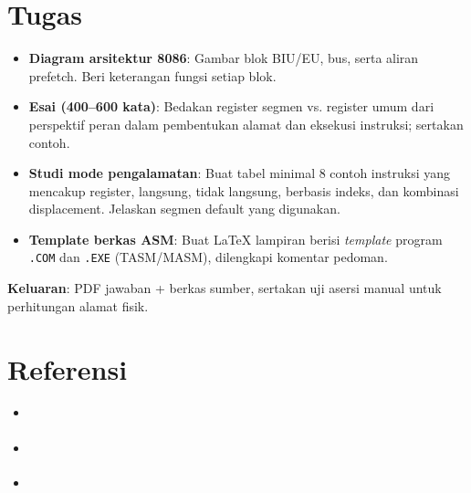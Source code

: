 \section{Tugas}
\begin{itemize}
  \item \textbf{Diagram arsitektur 8086}: Gambar blok BIU/EU, bus, serta aliran prefetch. Beri keterangan fungsi setiap blok.
  \item \textbf{Esai (400--600 kata)}: Bedakan register segmen vs. register umum dari perspektif peran dalam pembentukan alamat dan eksekusi instruksi; sertakan contoh.
  \item \textbf{Studi mode pengalamatan}: Buat tabel minimal 8 contoh instruksi yang mencakup register, langsung, tidak langsung, berbasis indeks, dan kombinasi displacement. Jelaskan segmen default yang digunakan.
  \item \textbf{Template berkas ASM}: Buat \LaTeX{} lampiran berisi \textit{template} program \texttt{.COM} dan \texttt{.EXE} (TASM/MASM), dilengkapi komentar pedoman.
\end{itemize}
\noindent\textbf{Keluaran}: PDF jawaban + berkas sumber, sertakan uji asersi manual untuk perhitungan alamat fisik.

\section{Referensi}\label{sec:arsitektur-referensi}
\begin{itemize}
    \item \cite{brey1986mikroprosesor}
    \item \cite{intel2019manual32}
    \item \cite{wiki_8086}
\end{itemize}

